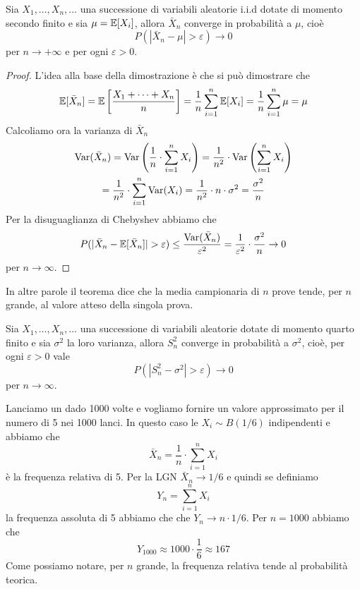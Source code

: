 \begin{theorem}\label{th: lgn}
	Sia $X_1, \dots, X_n, \dots$ una successione di variabili aleatorie i.i.d dotate di momento
	secondo finito e sia $\mu = \mathbb{E}[X_i]$, allora $\bar{X}_n$ converge in probabilità a $\mu$, cioè
	\[ P(|\bar{X}_n - \mu| > \varepsilon) \to 0 \]
	per $n \to +\infty$ e per ogni $\varepsilon > 0$.
	\begin{proof}
		L'idea alla base della dimostrazione è che si può dimostrare che
		\[
			\mathbb{E}[\bar{X}_n] = \mathbb{E}\left[ \frac{X_1 + \dots + X_n}{n} \right]
			=               \frac{1}{n} \sum_{i=1}^n \mathbb{E}[X_i] = \frac{1}{n} \sum_{i=1}^n \mu = \mu
		\]
		Calcoliamo ora la varianza di $\bar{X}_n$
		\begin{multline*}
			\operatorname{Var}(\bar{X}_n) =
			\operatorname{Var} \left( \frac{1}{n} \cdot \sum_{i=1}^n X_i \right) =
			\frac{1}{n^2} \cdot \operatorname{Var} \left( \sum_{i=1}^n X_i \right)  \\ =
			\frac{1}{n^2} \cdot \sum_{i=1}^n \operatorname{Var}(X_i) =
			\frac{1}{n^2} \cdot n \cdot \sigma^2 = \frac{\sigma^2}{n}
		\end{multline*}
		Per la disuguaglianza di Chebyshev abbiamo che
		\[
			P(|\bar{X}_n - \mathbb{E}[\bar{X}_n]| >
			\varepsilon) \leq \frac{\operatorname{Var}(\bar{X}_n)}{\varepsilon^2} =
			\frac{1}{\varepsilon^2} \cdot \frac{\sigma^2}{n} \to 0
		\]
		per $n \to \infty$.
	\end{proof}
\end{theorem}

In altre parole il teorema dice che la media campionaria di $n$ prove tende, per $n$ grande, al
valore atteso della singola prova.

\begin{corollary}\label{cor: lgn}
	Sia $X_1, \dots, X_n, \dots$ una successione di variabili aleatorie dotate di momento quarto
	finito e sia $\sigma^2$ la loro varianza, allora $S_n^2$ converge in probabilità a $\sigma^2$,
	cioè, per ogni $\varepsilon > 0$ vale
	\[ P(|S_n^2 - \sigma^2| > \varepsilon) \to 0 \]
	per $n \to \infty$.
\end{corollary}

\begin{example}
	Lanciamo un dado 1000 volte e vogliamo fornire un valore approssimato per il numero di 5 nei
	1000 lanci. In questo caso le $X_i \sim B(1/6)$ indipendenti e abbiamo che
	\[ \bar{X}_n = \frac{1}{n} \cdot \sum_{i=1}^{n} X_i \]
	è la frequenza relativa di 5. Per la LGN $\bar{X}_n \to 1/6$ e quindi se definiamo
	\[ Y_n = \sum_{i=1}^{n} X_i \]
	la frequenza assoluta di 5 abbiamo che che $Y_n \to n \cdot 1/6$. Per $n=1000$ abbiamo che
	\[ Y_{1000} \approx 1000 \cdot \frac{1}{6} \approx 167 \]
	Come possiamo notare, per $n$ grande, la frequenza relativa tende al probabilità teorica.
\end{example}

